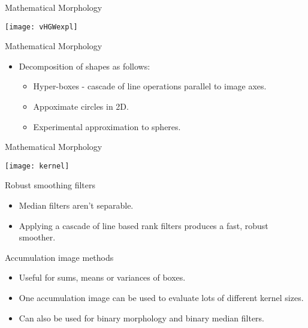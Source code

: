 \documentclass[pdf,prettybox]{prosper}
\begin{document}
\begin{slide}{Mathematical Morphology}
\vspace{0.4cm}
\begin{centering}
\begin{figure*}
\texttt{[image: vHGWexpl]}
\end{figure*}
\end{centering}
\end{slide}

\begin{slide}{Mathematical Morphology}
\begin{itemize}
\item Decomposition of shapes as follows:
	\begin{itemize}
	\item Hyper-boxes - cascade of line operations parallel to image axes.
	\item Appoximate circles in 2D.
	\item Experimental approximation to spheres.
	\end{itemize}
\end{itemize}
\end{slide}

\begin{slide}{Mathematical Morphology}
\vspace{0.4cm}
\begin{centering}
\begin{figure*}
\texttt{[image: kernel]}
\end{figure*}
\end{centering}
\end{slide}

\begin{slide}{Robust smoothing filters}
\begin{itemize}
\item Median filters aren't separable.
\item Applying a cascade of line based rank filters produces a fast, robust smoother.
\end{itemize}
\end{slide}

\begin{slide}{Accumulation image methods}
\begin{itemize}
\item Useful for sums, means or variances of boxes.
\item One accumulation image can be used to evaluate lots of different kernel sizes.
\item Can also be used for binary morphology and binary median filters.
\end{itemize}
\end{slide}
\end{document}
